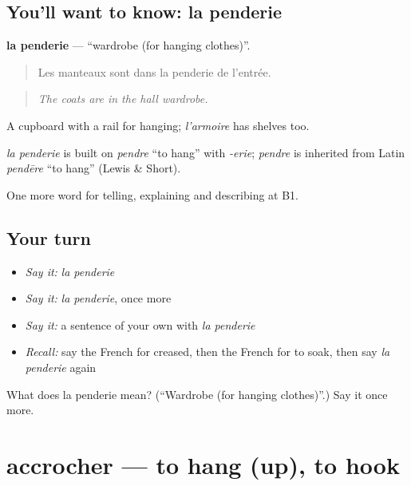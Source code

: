 \subsection*{You'll want to know: la penderie}
\textbf{la penderie} — \textquotedblleft{}wardrobe (for hanging clothes)\textquotedblright{}.

\begin{quote}
Les manteaux sont dans la penderie de l'entrée.
\end{quote}

\begin{quote}
\emph{The coats are in the hall wardrobe.}
\end{quote}

A cupboard with a rail for hanging; \emph{l'armoire} has shelves too.

\begin{cousinweb}
\emph{la penderie} is built on \emph{pendre} \textquotedblleft{}to hang\textquotedblright{} with \emph{-erie}; \emph{pendre} is inherited from Latin \emph{pendēre} \textquotedblleft{}to hang\textquotedblright{} (Lewis \& Short).
\end{cousinweb}

\begin{grammarlens}[title={What you've built}]
One more word for telling, explaining and describing at B1.
\end{grammarlens}

\subsection*{Your turn}
\begin{itemize}
\raggedright
  \item \emph{Say it:} \emph{la penderie}
  \item \emph{Say it:} \emph{la penderie}, once more
  \item \emph{Say it:} a sentence of your own with \emph{la penderie}
  \item \emph{Recall:} say the French for creased, then the French for to soak, then say \emph{la penderie} again
\end{itemize}

\begin{tcolorbox}[breakable,colback=teal!4,colframe=teal!35!black,title={Before you move on}]
What does la penderie mean? (\textquotedblleft{}Wardrobe (for hanging clothes)\textquotedblright{}.) Say it once more.
\end{tcolorbox}
\section[accrocher]{accrocher — to hang (up), to hook}

